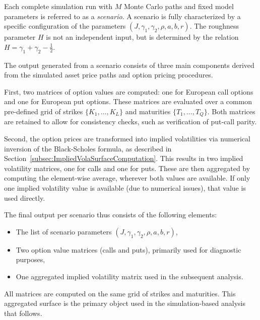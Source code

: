 Each complete simulation run with $M$ Monte Carlo paths and fixed model parameters is referred to as a \emph{scenario}. A scenario is fully characterized by a specific configuration of the parameters $(J, \gamma_1, \gamma_2, \rho, a, b, r)$. The roughness parameter $H$ is not an independent input, but is determined by the relation $H = \gamma_1 + \gamma_2 - \frac{1}{2}$.

The output generated from a scenario consists of three main components derived from the simulated asset price paths and option pricing procedures.

First, two matrices of option values are computed: one for European call options and one for European put options. These matrices are evaluated over a common pre-defined grid of strikes $\{K_1, \ldots, K_L\}$ and maturities $\{T_1, \ldots, T_Q\}$. Both matrices are retained to allow for consistency checks, such as verification of put-call parity.

Second, the option prices are transformed into implied volatilities via numerical inversion of the Black-Scholes formula, as described in Section~\ref{subsec:ImpliedVolaSurfaceComputation}. This results in two implied volatility matrices, one for calls and one for puts. These are then aggregated by computing the element-wise average, wherever both values are available. If only one implied volatility value is available (due to numerical issues), that value is used directly.

The final output per scenario thus consists of the following elements: 
\begin{itemize}
    \item The list of scenario parameters $(J, \gamma_1, \gamma_2, \rho, a, b, r)$,
    \item Two option value matrices (calls and puts), primarily used for diagnostic purposes,
    \item One aggregated implied volatility matrix used in the subsequent analysis.
\end{itemize}

All matrices are computed on the same grid of strikes and maturities. This aggregated surface is the primary object used in the simulation-based analysis that follows.